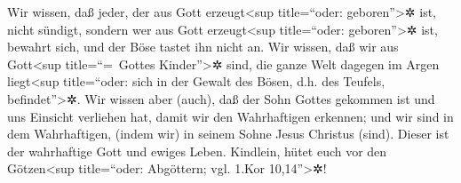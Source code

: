  Wir wissen, daß jeder, der aus Gott erzeugt\textless sup
title=``oder: geboren''\textgreater✲ ist, nicht sündigt, sondern wer aus
Gott erzeugt\textless sup title=``oder: geboren''\textgreater✲ ist,
bewahrt sich, und der Böse tastet ihn nicht an.  Wir
wissen, daß wir aus Gott\textless sup title=``=~Gottes
Kinder''\textgreater✲ sind, die ganze Welt dagegen im Argen
liegt\textless sup title=``oder: sich in der Gewalt des Bösen, d.h. des
Teufels, befindet''\textgreater✲.  Wir wissen aber
(auch), daß der Sohn Gottes gekommen ist und uns Einsicht verliehen hat,
damit wir den Wahrhaftigen erkennen; und wir sind in dem Wahrhaftigen,
(indem wir) in seinem Sohne Jesus Christus (sind). Dieser ist der
wahrhaftige Gott und ewiges Leben.  Kindlein, hütet euch
vor den Götzen\textless sup title=``oder: Abgöttern; vgl. 1.Kor
10,14''\textgreater✲!

